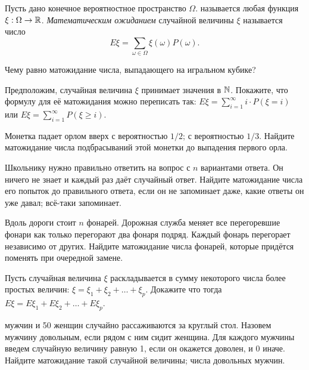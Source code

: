 \documentclass[a4paper,12pt]{article}
\begin{document}
\setlength{\abovedisplayskip}{3pt}
\setlength{\belowdisplayskip}{-10pt}


\vspace{1mm}
Пусть дано конечное вероятностное пространство $\Omega$.
 называется любая функция $\xi:\Omega\rightarrow\mathbb{R}$. \emph{Математическим ожиданием} случайной величины $\xi$ называется число
$$E\xi = \sum_{\omega \in \Omega} \xi(\omega) P(\omega).$$
\vspace{-1mm}

Чему равно матожидание числа, выпадающего на игральном кубике?

Предположим, случайная величина $\xi$ принимает значения в $\mathbb{N}$. Покажите, что формулу для её матожидания можно переписать так: $E\xi = \sum_{i=1}^\infty i \cdot P(\xi = i)$ или $E\xi = \sum_{i=1}^\infty P(\xi \ge i)$.

Монетка падает орлом вверх
 с вероятностью $1/2$;
 с вероятностью $1/3$.
Найдите матожидание числа подбрасываний этой монетки до выпадения первого орла.

Школьнику нужно правильно ответить на вопрос с $n$ вариантами ответа. Он ничего не знает и каждый раз даёт случайный ответ. Найдите матожидание числа его попыток до правильного ответа, если
 он не запоминает даже, какие ответы он уже давал;
 всё-таки запоминает.

Вдоль дороги стоит $n$ фонарей. Дорожная служба меняет все перегоревшие фонари как только перегорают два фонаря подряд. Каждый фонарь перегорает независимо от других. Найдите матожидание числа фонарей, которые придётся поменять при очередной замене.

Пусть случайная величина $\xi$ раскладывается в сумму некоторого числа более простых величин: $\xi = \xi_1 + \xi_2 + \ldots + \xi_p$. Докажите что тогда $E\xi = E\xi_1 + E\xi_2 + \ldots + E\xi_p$.

 мужчин и 50 женщин случайно рассаживаются за круглый стол. Назовем мужчину довольным, если рядом с ним сидит женщина. Для каждого мужчины введем случайную величину равную 1, если он окажется доволен, и 0 иначе. Найдите матожидание
 такой случайной величины;
 числа довольных мужчин.
\end{document}

